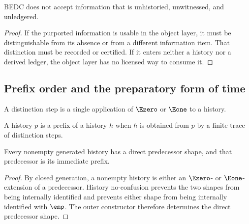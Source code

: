 \begin{corollary}
\label{cor:philosophy-no-bare-information}
BEDC does not accept information that is unhistoried, unwitnessed, and
unledgered.
\end{corollary}
\begin{proof}
If the purported information is usable in the object layer, it must be
distinguishable from its absence or from a different information item.
That distinction must be recorded or certified. If it enters neither a
history nor a derived ledger, the object layer has no licensed way to
consume it.
\end{proof}

\subsection{Prefix order and the preparatory form of time}
\label{subsec:prefix-order-time-preparation}

\begin{definition}
\label{def:philosophy-distinction-step}
A distinction step is a single application of \(\Ezero\) or \(\Eone\)
to a history.
\end{definition}

\begin{definition}
\label{def:philosophy-history-prefix}
A history \(p\) is a prefix of a history \(h\) when \(h\) is obtained
from \(p\) by a finite trace of distinction steps.
\end{definition}

\begin{theorem}
\label{thm:philosophy-history-generation-prefix-order}
Every nonempty generated history has a direct predecessor shape, and
that predecessor is its immediate prefix.
\end{theorem}
\begin{proof}
By closed generation, a nonempty history is either an \(\Ezero\)- or
\(\Eone\)-extension of a predecessor. History no-confusion prevents the
two shapes from being internally identified and prevents either shape
from being internally identified with \(\emp\). The outer constructor
therefore determines the direct predecessor shape.
\end{proof}

